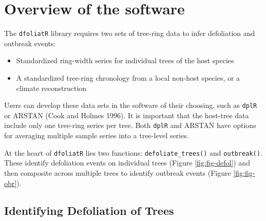 \documentclass[review]{elsarticle} %
\providecommand{\tightlist}{%
  \setlength{\itemsep}{0pt}\setlength{\parskip}{0pt}}
\begin{document}
\hypertarget{overview-of-the-software}{%
\section{Overview of the software}\label{overview-of-the-software}}

The \texttt{dfoliatR} library requires two sets of tree-ring data to infer defoliation and outbreak events:

\begin{itemize}
\tightlist
\item
  Standardized ring-width series for individual trees of the host species
\item
  A standardized tree-ring chronology from a local non-host species, or a climate reconstruction
\end{itemize}

Users can develop these data sets in the software of their choosing, such as \texttt{dplR} or ARSTAN (Cook and Holmes 1996). It is important that the host-tree data include only one tree-ring series per tree. Both \texttt{dplR} and ARSTAN have options for averaging multiple sample series into a tree-level series.

At the heart of \texttt{dfoliatR} lies two functions: \texttt{defoliate\_trees()} and \texttt{outbreak()}. These identify defoliation events on individual trees (Figure \ref{fig:fig-defol}) and then composite across multiple trees to identify outbreak events (Figure \ref{fig:fig-obr}).

\hypertarget{identifying-defoliation-of-trees}{%
\subsection{Identifying Defoliation of Trees}\label{identifying-defoliation-of-trees}}
\end{document}
